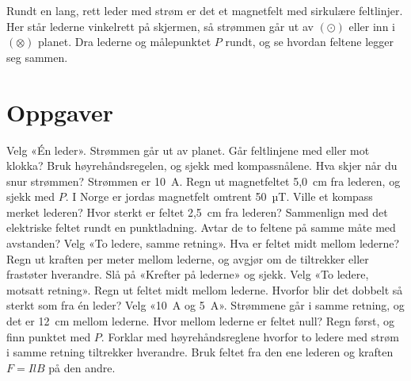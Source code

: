 \documentclass[11pt]{article}
\begin{document}

Rundt en lang, rett leder med strøm er det et magnetfelt med sirkulære feltlinjer. Her står lederne vinkelrett på skjermen, så strømmen går ut av $(⊙)$ eller inn i $(⊗)$ planet. Dra lederne og målepunktet $P$ rundt, og se hvordan feltene legger seg sammen.

\section*{Oppgaver}

\begin{oppgaveliste}
\oppgave {}Velg «Én leder». Strømmen går ut av planet. Går feltlinjene med eller mot klokka? Bruk høyrehåndsregelen, og sjekk med kompassnålene. Hva skjer når du snur strømmen?
\svar
\oppgave {}Strømmen er 10~A. Regn ut magnetfeltet 5,0~cm fra lederen, og sjekk med $P$. I Norge er jordas magnetfelt omtrent 50~µT. Ville et kompass merket lederen?
\svar
\oppgave {}Hvor sterkt er feltet 2,5~cm fra lederen? Sammenlign med det elektriske feltet rundt en punktladning. Avtar de to feltene på samme måte med avstanden?
\svar
\oppgave {}Velg «To ledere, samme retning». Hva er feltet midt mellom lederne? Regn ut kraften per meter mellom lederne, og avgjør om de tiltrekker eller frastøter hverandre. Slå på «Krefter på lederne» og sjekk.
\svar
\oppgave {}Velg «To ledere, motsatt retning». Regn ut feltet midt mellom lederne. Hvorfor blir det dobbelt så sterkt som fra én leder?
\svar
\oppgave {}Velg «10~A og 5~A». Strømmene går i samme retning, og det er 12~cm mellom lederne. Hvor mellom lederne er feltet null? Regn først, og finn punktet med $P$.
\svar
\oppgave {}Forklar med høyrehåndsreglene hvorfor to ledere med strøm i samme retning tiltrekker hverandre. Bruk feltet fra den ene lederen og kraften $F = IlB$ på den andre.
\svar
\end{oppgaveliste}
\end{document}
